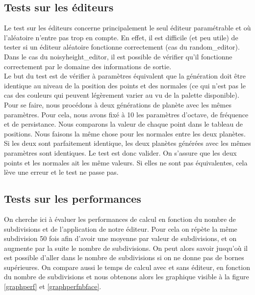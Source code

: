 \documentclass[a4paper]{article}
\begin{document}
\subsection{Tests sur les éditeurs}

Le test sur les éditeurs concerne principalement le seul éditeur paramétrable et où l'aléatoire n'entre pas trop en compte. En effet, il est difficile (et peu utile) de tester si un éditeur aléatoire fonctionne correctement (cas du random\_editor). Dans le cas du noisyheight\_editor, il est possible de vérifier qu'il fonctionne correctement par le domaine des informations de sortie.\\

Le but du test est de vérifier à paramètres équivalent que la génération doit être identique au niveau de la position des points et des normales (ce qui n'est pas le cas des couleurs qui peuvent légèrement varier au vu de la palette disponible). Pour se faire, nous procédons à deux générations de planète avec les mêmes paramètres. Pour cela, nous avons fixé à 10 les paramètres d'octave, de fréquence et de persistance. Nous comparons la valeur de chaque point dans le tableau de positions. Nous faisons la même chose pour les normales entre les deux planètes. Si les deux sont parfaitement identique, les deux planètes générées avec les mêmes paramètres sont identiques. Le test est donc valider. On s'assure que les deux points et les normales ait les même valeurs. Si elles ne sont pas équivalentes, cela lève une erreur et le test ne passe pas.

\subsection{Tests sur les performances}

On cherche ici à évaluer les performances de calcul en fonction du nombre de subdivisions et de l'application de notre éditeur. Pour cela on répète la même subdivision 50 fois afin d'avoir une moyenne par valeur de subdivisions, et on augmente par la suite le nombre de subdivisions. On peut alors savoir jusqu'où il est possible d'aller dans le nombre de subdivisions si on ne donne pas de bornes supérieures. On compare aussi le temps de calcul avec et sans éditeur, en fonction du nombre de subdivisions et nous obtenons alors les graphique visible à la figure \ref{graphperf} et \ref{graphperfnbface}.\\
\end{document}
